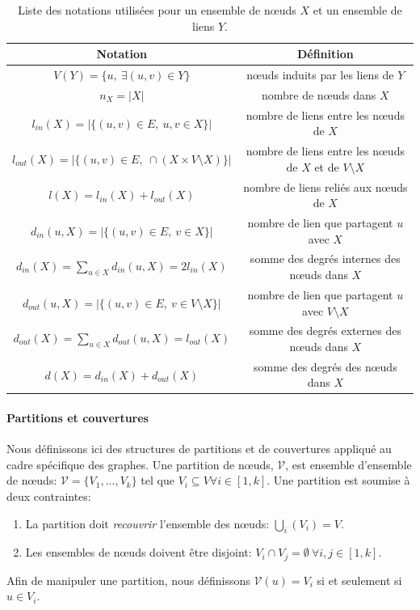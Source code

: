 \begin{table}
  \centering
    \begin{tabular}{|c|c|}
     \hline
    \rule[-1ex]{0pt}{4ex} Notation & Définition \\
  \hline
		\hline
		\rule[-1ex]{0pt}{4ex}$V(Y)=\{u,\ \exists (u,v) \in Y \}$ & n\oe uds induits par les liens de $Y$\\
		\hline
        \rule[-1ex]{0pt}{4ex}$n_X=|X|$ & nombre de n\oe uds dans $X$\\
        \hline
        \rule[-1ex]{0pt}{4ex} $l_{in}(X)=|\{(u,v) \in E,\ u,v \in X\}|$ & nombre de liens entre les n\oe uds de $X$\\
        \hline
        \rule[-1ex]{0pt}{4ex} $l_{out}(X)=|\{(u,v) \in E,\ \cap (X \times V \setminus X)\}|$ & nombre de liens entre les n\oe uds de $X$ et de $V \setminus X$ \\
        \hline
        \rule[-1ex]{0pt}{4ex} $l(X)=l_{in}(X)+l_{out}(X)$ & nombre de liens reliés aux n\oe uds de $X$\\
        \hline
        \rule[-1ex]{0pt}{4ex} $d_{in}(u,X)=|\{(u,v) \in E,\ v \in X\}|$ & nombre de lien que partagent $u$ avec $X$ \\
        \hline
        \rule[-1ex]{0pt}{4ex} $d_{in}(X)=\sum_{u \in X} d_{in}(u,X)=2l_{in}(X)$ & somme des degrés internes des n\oe uds dans $X$ \\
        \hline
        \rule[-1ex]{0pt}{4ex} $d_{out}(u,X)=|\{(u,v) \in E,\ v \in V \setminus X\}|$ & nombre de lien que partagent $u$ avec $V \setminus X$ \\
        \hline
        $d_{out}(X)=\sum_{u \in X} d_{out}(u,X)=l_{out}(X)$ & somme des degrés externes des n\oe uds dans $X$ \\
        \hline
        $d(X)=d_{in}(X)+ d_{out}(X)$ & somme des degrés des n\oe uds dans $X$ \\
        \hline
    \end{tabular}
    \caption{Liste des notations utilisées pour un ensemble de n\oe uds $X$ et un ensemble de liens $Y$.}
         \label{tab:notation_groupe_noeuds}
\end{table}%


\paragraph{Partitions et couvertures}
Nous définissons ici des structures de partitions et de couvertures appliqué au cadre spécifique des graphes.
Une partition de n\oe uds, $\mathcal{V}$, est ensemble d'ensemble de n\oe uds: $\mathcal{V}= \{V_1,..., V_k\}$ tel que $V_i \subseteq V \forall i \in [1,k]$.
Une partition est soumise à deux contraintes:
\begin{enumerate}
\item La partition doit \emph{recouvrir} l'ensemble des n\oe uds: $\bigcup_{i}( V_i) = V$.
\item Les ensembles de n\oe uds doivent être disjoint: $V_i \cap V_j = \emptyset\ \forall i,j \in [1,k]$.
\end{enumerate}
Afin de manipuler une partition, nous définissons $\mathcal{V}(u)=V_i$ si et seulement si $u \in V_i$.


